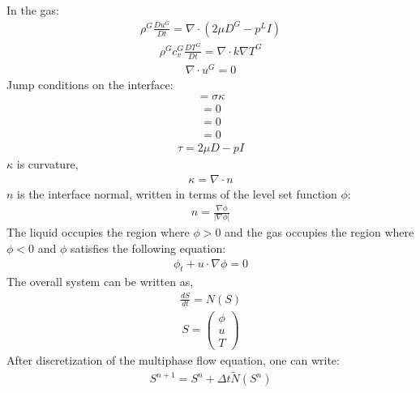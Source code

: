 \documentclass[]{article}
\begin{document}
In the gas:
\begin{eqnarray}
	\rho^{G}\frac{Du^{G}}{Dt}=\nabla\cdot(2\mu D^{G}-p^{L}I)
\end{eqnarray}
\begin{eqnarray}
        \rho^{G}c_{v}^{G}\frac{DT^{G}}{Dt}=\nabla\cdot k\nabla T^{G}
\end{eqnarray}
\begin{eqnarray}
	\nabla\cdot u^{G}=0
\end{eqnarray}
Jump conditions on the interface:
\begin{eqnarray}
	[n \cdot \tau \cdot n]=\sigma \kappa
\end{eqnarray}
\begin{eqnarray}
        [u]=0
\end{eqnarray}
\begin{eqnarray}
	[T]=0
\end{eqnarray}
\begin{eqnarray}
	[k\nabla T\cdot n]=0
\end{eqnarray}
\begin{eqnarray}
\tau=2\mu D - pI
\end{eqnarray}
$\kappa$ is curvature,
\begin{eqnarray}
\kappa=\nabla\cdot n
\end{eqnarray}
$n$ is the interface normal, written in terms of the level set function $\phi$:
\begin{eqnarray}
	n=\frac{\nabla\phi}{|\nabla\phi|}
\end{eqnarray}
The liquid occupies the region where $\phi>0$ and the gas occupies the
region where $\phi<0$ and $\phi$ satisfies the following equation:
\begin{eqnarray}
	\phi_{t}+u \cdot\nabla\phi=0
\end{eqnarray}
The overall system can be written as,
\begin{eqnarray}
	\frac{d S}{dt}=N(S)
\end{eqnarray}
\begin{eqnarray}
	S=\left( \begin{array}{c}
		\phi \\
	u \\
        T \end{array} \right)
\end{eqnarray}
After discretization of the multiphase flow equation, one can write:
\begin{eqnarray}
	S^{n+1}=S^{n}+\Delta t \tilde{N}(S^{n}) \label{discrete}
\end{eqnarray}
\end{document}
